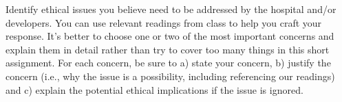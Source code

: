 \documentclass[11pt, letterpaper]{article}
\begin{document}
Identify ethical issues you believe need to be addressed by the hospital and/or developers.  You can use relevant readings from class to help you craft your response. It's better to choose one or two of the most important concerns and explain them in detail rather than try to cover too many things in this short assignment. For each concern, be sure to a) state your concern, b) justify the concern (i.e., why the issue is a possibility, including referencing our readings) and c)  explain the potential ethical implications if the issue is ignored.
\end{document}
